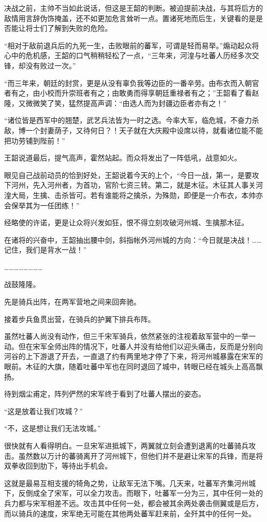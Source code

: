 决战之前，主帅不当如此说话，但这是王韶的判断。被迫提前决战，与其将后方的敌情用言辞伪饰掩盖，还不如更加危言耸听一点。置诸死地而后生，关键看的是是否能让将士们了解到失败的危险。

“相对于敌前退兵后的九死一生，击败眼前的蕃军，可谓是轻而易举。”煽动起众将心中的危机感，王韶的口气稍稍轻松了一点，“三年来，河湟与吐蕃人历经多次交锋，却没有败过一次。”

“而三年来，朝廷的封赏，更是从没有辜负我等边臣的一番辛劳。由布衣而入朝官者有之，由小校而升崇班者有之；由敢勇而得享朝廷重禄者有之；”王韶看了看赵隆，又微微笑了笑，猛然提高声调：“由选人而为封疆边臣者亦有之！”

“诸位皆是西军中的翘楚，武艺兵法皆为一时之选。今率大军，临危城，不奋力杀敌，博一个封妻荫子，又待何日？！天子就在大庆殿中设席以待，就看诸位能不能把功劳铺到陛前！”

王韶说道最后，提气高声，霍然站起。而众将发出了一阵低吼，战意如火。

眼见自己战前动员的恰到好处，王韶说着今天的上个，“今日一战，第一，是要攻下河州，先入河州者，为首功，官阶七资三转。第二，就是木征。木征其人事关河湟大局，生擒、击杀皆可。若有谁能将之擒杀，为殊勋，即便是一介布衣，本帅亦会保举其为一任团练！”

经略使的许诺，更是让众将兴发如狂，恨不得立刻攻破河州城、生擒那木征。

在诸将的兴奋中，王韶抽出腰中剑，斜指帐外河州城的方向：“今日就是决战！……记住，我们是背水一战！”

……………………

战鼓隆隆。

先是骑兵出阵，在两军营地之间来回奔驰。

接着步兵鱼贯出营，在骑兵的护翼下排兵布阵。

虽然吐蕃人尚没有动作，但三千宋军骑兵，依然紧张的注视着敌军营中的一举一动。但在宋军全师出阵的情况下，吐蕃人并没有给他们以迎头痛击，反而是分别向河谷的上下游退了开去，一直退了约有两里地才停了下来，将河州城暴露在宋军的眼前。木征的大旗，随着吐蕃中军也在同时退回了城中，转眼已经在城头上高高飘扬。

待到烟尘甫定，阵列俨然的宋军终于看到了吐蕃人摆出的姿态。

“这是放着让我们攻城？”

“不，这是想让我们无法攻城。”

很快就有人看得明白。一旦宋军进抵城下，两翼就立刻会遭到退离的吐蕃骑兵攻击。虽然数以万计的蕃骑离开了河州城下，但他们并不是避让宋军的兵锋，而是将双拳收回到肋下，等待出手机会。

这就是最易互相支援的犄角之势，让敌军无法下嘴。几天来，吐蕃军齐集河州城下，反倒成全了宋军，可以全力攻击。而眼下，吐蕃军一分为三，其中任何一处的兵力都与宋军相差不远。攻击其中任何一处，都会被其余两处袭击侧翼或是后方，而以骑兵的速度，宋军绝无可能在其他两处蕃军赶来前，全歼其中的任何一处。

